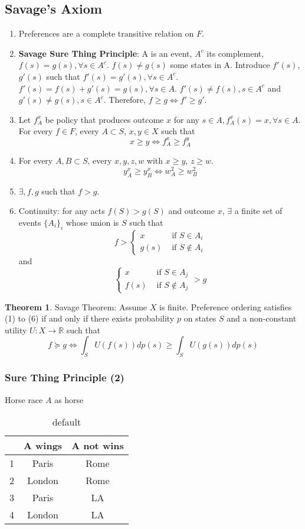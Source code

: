 \documentclass[11pt, a4paper, oneside]{article}
\theoremstyle{definition}
\theoremstyle{proposition}
\theoremstyle{corollary}
\theoremstyle{lemma}
\newtheorem{myt}{Theorem}
\theoremstyle{theorem}
\begin{document}
\subsection{Savage's Axiom}
\begin{enumerate}[(1)]
\item Preferences are a complete transitive relation on $F$. 
\item \textbf{Savage Sure Thing Principle}: A is an event, $A^c$ its complement, $f(s) = g(s), \forall s \in A^c$. $f(s) \neq g(s)$ some states in A. Introduce $f'(s)$, $g'(s)$ such that $f'(s) = g'(s), \forall s \in A^c$. $f'(s) = f(s) + g'(s) = g(s), \forall s \in A$. $f'(s) \neq f(s), s \in A^c$ and $g'(s) \neq g(s), s \in A^c$. Therefore, $f \geq g \iff f' \geq g'$.
\item Let $f_A^x$ be policy that produces outcome $x$ for any $s\in A, f_A^x(s) = x, \forall s \in A$.  For every $f \in F$, every $A\subset S$, $x, y \in X$ such that
$$x\geq y \iff f_A^x \geq f_A^y$$
\item For every $A, B \subset S$, every $x, y, z, w$ with $x \geq y$, $z \geq w$. 
$$y_A^x \geq y_B^x \iff w_A^2 \geq w_B^2$$
\item $\exists, f, g$ such that $f > g$. 
\item Continuity: for any acts $f(S) > g(S)$ and outcome $x$, $\exists$ a finite set of events $\{A_i\}_i$ whose union is $S$ such that
$$f > \begin{cases}
x & \text{ if } S \in A_i\\
g(s) & \text{ if } S \notin A_i
\end{cases}$$ and
$$\begin{cases}
x & \text{ if } S \in A_j\\
f(s) & \text{ if } S \notin A_j
\end{cases}> g$$
\end{enumerate}

\begin{myt}
Savage Theorem: Assume $X$ is finite. Preference ordering satisfies (1) to (6) if and only if there exists probability $p$ on states $S$ and a non-constant utility $U: X \to \mathbb{R}$ such that $$f \succeq g \iff \int_S U(f(s))dp(s) \geq \int_S U(g(s))dp(s)$$
\end{myt}

\subsubsection{Sure Thing Principle (2)}
Horse race $A$ as horse
\begin{table}[htp]
\caption{default}
\begin{center}
\begin{tabular}{|c|c|c|}
\hline
& A wings & A not wins \\
\hline
1 & Paris & Rome\\
2 & London & Rome \\
3 & Paris & LA \\
4 & London & LA\\
\hline
\end{tabular}
\end{center}
\label{Horse Race wining result}
\end{table}%
\end{document}
